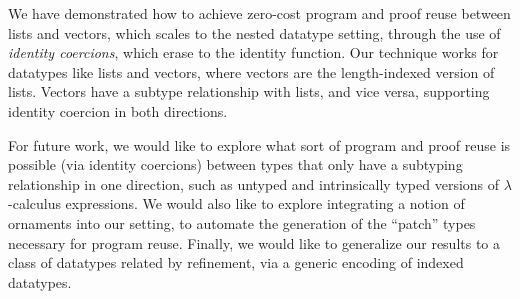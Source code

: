 \documentclass[a4paper,envcountsame,envcountsect]{llncs}
\makeatletter
\let\oldappendix\appendix %
\renewcommand\appendix{%
    \oldappendix
    \newcommand{\section@cntformat}{\appendixname~\thesection\quad}
}
\makeatother
\begin{document}
We have demonstrated how to achieve zero-cost program and proof reuse
between lists and vectors, which scales to the nested datatype
setting, through the use of \textit{identity coercions}, which erase to
the identity function. Our technique works for datatypes like lists
and vectors, where vectors are the length-indexed version of
lists. Vectors have a subtype relationship with lists, and vice versa,
supporting identity coercion in both directions.

For future work, we
would like to explore what sort of program and proof reuse is possible
(via identity coercions) between types that only have a subtyping
relationship in one direction, such as untyped and intrinsically typed
versions of $\lambda$-calculus expressions.
We would also like to explore integrating a notion of ornaments
into our setting, to automate the generation of the ``patch'' types
necessary for program reuse.
Finally, we would like to generalize our results to a class of
datatypes related by refinement, via a generic encoding of indexed
datatypes.




\end{document}
